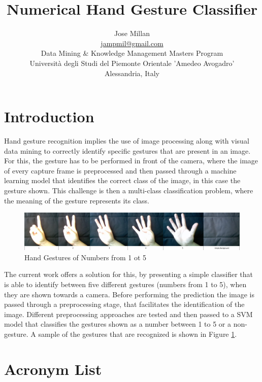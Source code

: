 \documentclass[a4paper,10pt,english]{article}
\title{Numerical Hand Gesture Classifier}
\author{Jose Millan\\
    \url{jampmil@gmail.com}\\
    Data Mining \& Knowledge Management Masters Program\\
    Università degli Studi del Piemonte Orientale 'Amedeo Avogadro'\\
    Alessandria, Italy}
\date{}
\begin{document}
    \maketitle


     \section{Introduction}\label{sec:intro}
     
        Hand gesture recognition implies the use of image processing along with visual data mining to correctly identify specific gestures that are present in an image. For this, the gesture has to be performed in front of the camera, where the image of every capture frame is preprocessed and then passed through a machine learning model that identifies the correct class of the image, in this case the gesture shown. This challenge is then a multi-class classification problem, where the meaning of the gesture represents its class.
        
        \begin{figure}[h!]
            \centering
            \includegraphics[width=530pt]{images/hand_gestures}
            \caption{Hand Gestures of Numbers from 1 ot 5} \label{fig:hand_gestures}
        \end{figure}
        
        The current work offers a solution for this, by presenting a simple classifier that is able to identify between five different gestures (numbers from 1 to 5), when they are shown towards a camera. Before performing the prediction the image is passed through a preprocessing stage, that facilitates the identification of the image. Different preprocessing approaches are tested and then passed to a SVM model that classifies the gestures shown as a number between 1 to 5 or a non-gesture. A sample of the gestures that are recognized is shown in Figure \ref{fig:hand_gestures}.

     \section{Acronym List}
     
\end{document}
